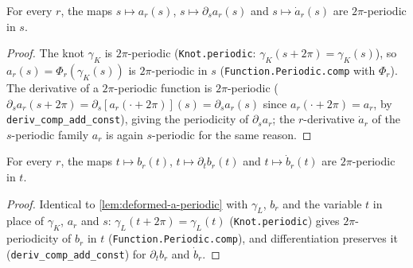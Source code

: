 \begin{lemma}
    \label{lem:deformed-a-periodic}
    For every $r$, the maps $s\mapsto a_r(s)$, $s\mapsto\partial_s a_r(s)$ and
    $s\mapsto\dot a_r(s)$ are $2\pi$-periodic in $s$.
\end{lemma}
\begin{proof}
    The knot $\gamma_K$ is $2\pi$-periodic (\texttt{Knot.periodic}:
    $\gamma_K(s+2\pi)=\gamma_K(s)$), so $a_r(s)=\Phi_r(\gamma_K(s))$ is $2\pi$-periodic
    in $s$ (\texttt{Function.Periodic.comp} with $\Phi_r$). The derivative of a
    $2\pi$-periodic function is $2\pi$-periodic
    ($\partial_s a_r(s+2\pi)=\partial_s[a_r(\cdot+2\pi)](s)=\partial_s a_r(s)$ since
    $a_r(\cdot+2\pi)=a_r$, by \texttt{deriv\_comp\_add\_const}), giving the
    periodicity of $\partial_s a_r$; the $r$-derivative $\dot a_r$ of the
    $s$-periodic family $a_r$ is again $s$-periodic for the same reason.
\end{proof}

\begin{lemma}
    \label{lem:deformed-b-periodic}
    For every $r$, the maps $t\mapsto b_r(t)$, $t\mapsto\partial_t b_r(t)$ and
    $t\mapsto\dot b_r(t)$ are $2\pi$-periodic in $t$.
\end{lemma}
\begin{proof}
    Identical to \cref{lem:deformed-a-periodic} with $\gamma_L$, $b_r$ and the
    variable $t$ in place of $\gamma_K$, $a_r$ and $s$: $\gamma_L(t+2\pi)=\gamma_L(t)$
    (\texttt{Knot.periodic}) gives $2\pi$-periodicity of $b_r$ in $t$
    (\texttt{Function.Periodic.comp}), and differentiation preserves it
    (\texttt{deriv\_comp\_add\_const}) for $\partial_t b_r$ and $\dot b_r$.
\end{proof}

